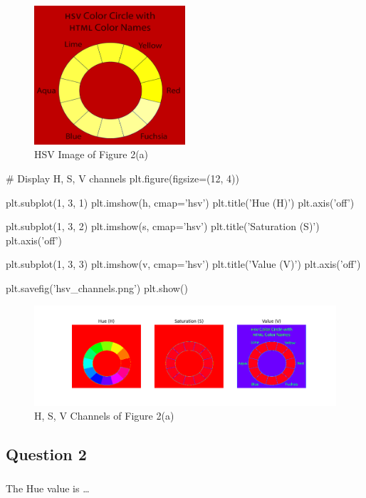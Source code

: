 \documentclass[12pt]{article}
\begin{document}
\begin{figure}[H]
  \centering
  \includegraphics[width=0.5\textwidth]{hsv_result.png}
  \caption{HSV Image of Figure 2(a)}
  \label{fig:example}
\end{figure}

\begin{python}
# Display H, S, V channels
plt.figure(figsize=(12, 4))

plt.subplot(1, 3, 1)
plt.imshow(h, cmap='hsv')
plt.title('Hue (H)')
plt.axis('off')

plt.subplot(1, 3, 2)
plt.imshow(s, cmap='hsv')
plt.title('Saturation (S)')
plt.axis('off')

plt.subplot(1, 3, 3)
plt.imshow(v, cmap='hsv')
plt.title('Value (V)')
plt.axis('off')

plt.savefig('hsv_channels.png')
plt.show()
\end{python}

\begin{figure}[H]
  \centering
  \includegraphics[width=1.0\textwidth]{hsv_channels.png}
  \caption{H, S, V Channels of Figure 2(a)}
  \label{fig:example}
\end{figure}

\subsection{Question 2}

\subsubsection{}
The Hue value is \dots
\end{document}
